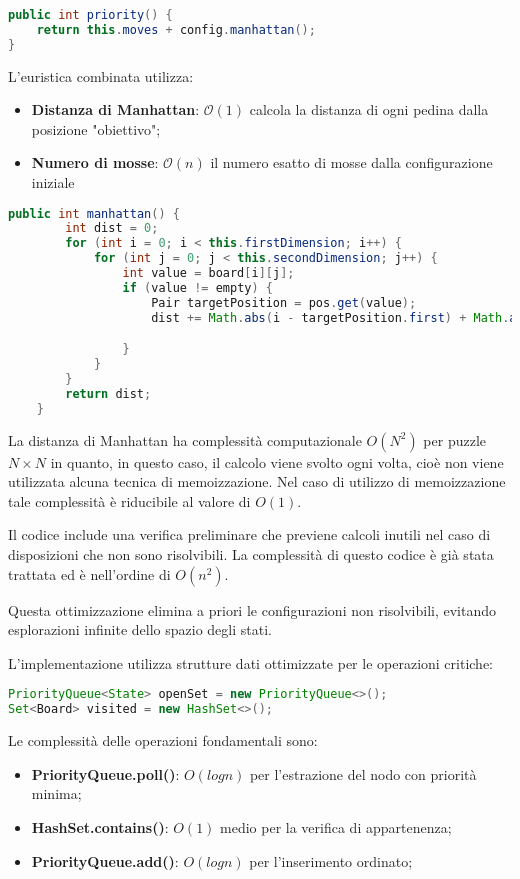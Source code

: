 \begin{lstlisting}[language=Java, caption=Implementazione della funzione di priorità]
public int priority() {
    return this.moves + config.manhattan();
}
\end{lstlisting}

L'euristica combinata utilizza:
\begin{itemize}
    \item \textbf{Distanza di Manhattan}: $\mathcal{O}(1)$ calcola la distanza di ogni pedina dalla posizione "obiettivo"; 
    \item \textbf{Numero di mosse}: $\mathcal{O}(n)$ il numero esatto di mosse dalla configurazione iniziale
\end{itemize}

\begin{lstlisting}[language=Java, caption=Calcolo delle distanze di Manhattan]
        public int manhattan() {
        int dist = 0;
        for (int i = 0; i < this.firstDimension; i++) {
            for (int j = 0; j < this.secondDimension; j++) {
                int value = board[i][j];
                if (value != empty) {
                    Pair targetPosition = pos.get(value); 
                    dist += Math.abs(i - targetPosition.first) + Math.abs(j - targetPosition.second);

                }
            }
        }
        return dist;
    }
\end{lstlisting}

La distanza di Manhattan ha complessità computazionale $O(N^2)$ per puzzle $N×N$ in quanto, in questo caso, il calcolo viene svolto ogni volta, cioè non viene utilizzata alcuna tecnica di memoizzazione. 
Nel caso di utilizzo di memoizzazione tale complessità è riducibile al valore di $O(1)$.


Il codice include una verifica preliminare che previene calcoli inutili nel caso di disposizioni che non sono risolvibili. 
La complessità di questo codice è già stata trattata ed è nell'ordine di $O(n^2)$.


Questa ottimizzazione elimina a priori le configurazioni non risolvibili, evitando esplorazioni infinite dello spazio degli stati.


L'implementazione utilizza strutture dati ottimizzate per le operazioni critiche:
\begin{lstlisting}[language=Java, caption=Inizializzazione delle strutture dati]
PriorityQueue<State> openSet = new PriorityQueue<>();
Set<Board> visited = new HashSet<>();
\end{lstlisting}
Le complessità delle operazioni fondamentali sono:
\begin{itemize}
    \item \textbf{PriorityQueue.poll()}: $O(logn)$ per l'estrazione del nodo con priorità minima;
    \item \textbf{HashSet.contains()}: $O(1)$ medio per la verifica di appartenenza;
    \item \textbf{PriorityQueue.add()}: $O(logn)$ per l'inserimento ordinato;
\end{itemize}


